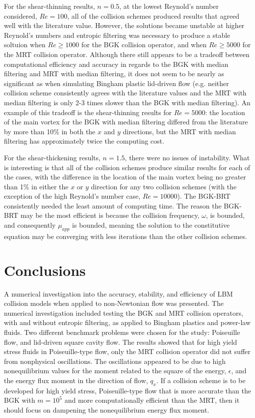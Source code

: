 For the shear-thinning results, $n = 0.5$, at the lowest Reynold's number considered, $Re = 100$, all of the collision schemes produced results that agreed well with the literature value.
However, the solutions became unstable at higher Reynold's numbers and entropic filtering was necessary to produce a stable soltuion when $Re \ge 1000$ for the BGK collision operator, and when $Re \ge 5000$ for the MRT collision operator.
Although there still appears to be a tradeoff between computational efficiency and accuracy in regards to the BGK with median filtering and MRT with median filtering, it does not seem to be nearly as significant as when simulating Bingham plastic lid-driven flow (e.g. neither collision scheme consistently agrees with the literature values and the MRT with median filtering is only 2-3 times slower than the BGK with median filtering).
An example of this tradeoff is the shear-thinning results for $Re = 5000$: the location of the main vortex for the BGK with median filtering differed from the literature by more than 10\% in both the $x$ and $y$ directions, but the MRT with median filtering has approximately twice the computing cost.

For the shear-thickening results, $n = 1.5$, there were no issues of instability.
What is interesting is that all of the collision schemes produce similar results for each of the cases, with the difference in the location of the main vortex being no greater than 1\% in either the $x$ or $y$ direction for any two collision schemes (with the exception of the high Reynold's number case, $Re = 10000$).
The BGK-BRT consistently needed the least amount of computing time.
The reason the BGK-BRT may be the most efficient is because the collision frequency, $\omega$, is bounded, and consequently $\mu_{app}$ is bounded, meaning the solution to the constitutive equation may be converging with less iterations than the other collision schemes.

\section{Conclusions} \label{sec:numerical-study-conclusions}

A numerical investigation into the accuracy, stability, and efficiency of LBM collision models when applied to non-Newtonian flow was presented.
The numerical investigation included testing the BGK and MRT collision operators, with and without entropic filtering, as applied to Bingham plastics and power-law fluids.
Two different benchmark problems were chosen for the study: Poiseuille flow, and lid-driven square cavity flow.
The results showed that for high yield stress fluids in Poiseuille-type flow, only the MRT collision operator did not suffer from nonphysical oscillations.
The oscillations appeared to be due to high nonequilibrium values for the moment related to the square of the energy, $\epsilon$, and the energy flux moment in the direction of flow, $q_x$.
If a collision scheme is to be developed for high yield stress, Poiseuille-type flow that is more accurate than the BGK with $m = 10^5$ and more computationally efficient than the MRT, then it should focus on dampening the nonequilibrium energy flux moment.

